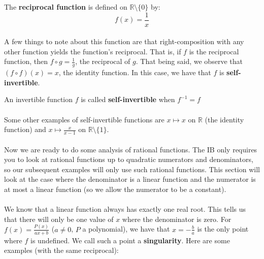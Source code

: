 \documentclass[12pt, a4paper, titlepage, twoside]{article}
\newcommand*{\R}{\mathbb{R}}
\begin{document}
	\begin{kp}
		The \textbf{reciprocal function} is defined on $\R \setminus \{0\}$ by:
		\[ f(x) = \dfrac{1}{x} \]
	\end{kp}
	
	\paragraph{}
	A few things to note about this function are that right-composition with any other function yields the function's reciprocal.
	That is, if $f$ is the reciprocal function, then $f \circ g = \frac{1}{g}$, the reciprocal of $g$. That being said, we observe that 
	$(f \circ f)(x) = x$, the identity function. In this case, we have that $f$ is \textbf{self-invertible}.\\
	
	\begin{kp}
		An invertible function $f$ is called \textbf{self-invertible} when $f^{-1} = f$
	\end{kp}
		
	\paragraph{}
	Some other examples of self-invertible functions are $x \mapsto x$ on $\R$ (the identity function) and $x \mapsto \frac{x}{x-1}$ on
	$\R \setminus \{1\}$. 
	
	\paragraph{}
	Now we are ready to do some analysis of rational functions. The IB only requires you to look at rational functions up to quadratic numerators
	and denominators, so our subsequent examples will only use such rational functions. This section will look at the case where the denominator 
	is a linear function and the numerator is at most a linear function (so we allow the numerator to be a constant).
	
	\paragraph{}
	We know that a linear function always has exactly one real root. This tells us that there will only be one value of $x$ where the denominator
	is zero. For $f(x) = \frac{P(x)}{ax+b}$ ($a \neq 0$, $P$ a polynomial), we have that $x = -\frac{b}{a}$ is the only point where $f$ is undefined. 
	We call such a point a \textbf{singularity}. Here are some examples (with the same reciprocal):
	
\end{document}
